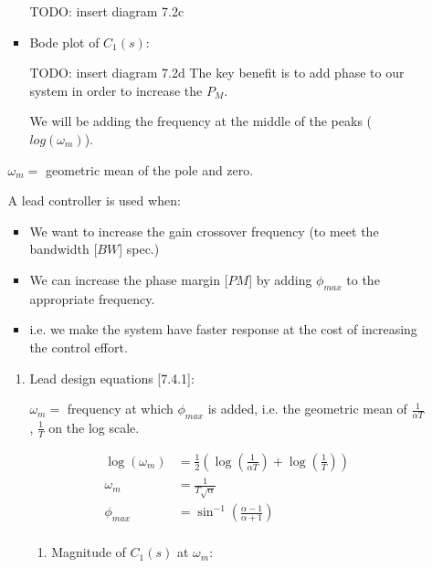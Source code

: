 \begin{enumerate}
\begin{enumerate}
\begin{itemize}
                        TODO: insert diagram 7.2c
                    \item Bode plot of $C_1(s):$

                        TODO: insert diagram 7.2d
                        The key benefit is to add phase to our system in order to increase the $P_M$.

                        We will be adding the frequency at the middle of the peaks ($log (\omega_m)$).
                \end{itemize}

                $\omega_m = $ geometric mean of the pole and zero.

                A lead controller is used when:
                \begin{itemize}
                    \item We want to increase the gain crossover frequency (to meet the bandwidth [$BW$] spec.)
                    \item We can increase the phase margin [$PM$] by adding $\phi_{max}$ to the appropriate frequency.
                    \item i.e. we make the system have faster response at the cost of increasing the control effort.
                \end{itemize}
                \begin{enumerate}
                    \item Lead design equations [7.4.1]:

                        $\omega_m = $ frequency at which $\phi_{max}$ is added, i.e. the geometric mean of $\frac{1}{\alpha T}$, $\frac{1}{T}$ on the log scale.

                        \begin{align*}
                            \log(\omega_m) &= \frac{1}{2} \left( \log\left( \frac{1}{\alpha T}\right) + \log\left( \frac{1}{T}\right) \right) \\
                            \omega_m &= \frac{1}{T \sqrt{\alpha}} \\
                            \phi_{max} &= \sin^{-1}\left( \frac{\alpha - 1}{\alpha + 1}\right) \\
                        \end{align*}
                        \begin{enumerate}
                            \item Magnitude of $C_1(s)$ at $\omega_m$:


\end{enumerate}
\end{enumerate}
\end{enumerate}
\end{enumerate}
